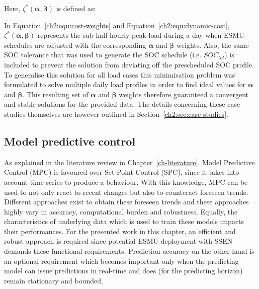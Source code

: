 

Here, $\zeta^*(\boldsymbol{\alpha}, \boldsymbol{\beta})$ is defined as:



In Equation~\ref{ch2:equ:cost-weights} and Equation~\ref{ch2:equ:dynamic-cost}, $\zeta^*(\boldsymbol{\alpha}, \boldsymbol{\beta})$ represents the sub-half-hourly peak load during a day when ESMU schedules are adjusted with the corresponding $\boldsymbol{\alpha}$ and $\boldsymbol{\beta}$ weights.
Also, the same SOC tolerance that was used to generate the SOC schedule (i.e. $SOC_{tol}$) is included to prevent the solution from deviating off the prescheduled SOC profile.
To generalise this solution for all load cases this minimisation problem was formulated to solve multiple daily load profiles in order to find ideal values for $\boldsymbol{\alpha}$ and $\boldsymbol{\beta}$.
This resulting set of $\boldsymbol{\alpha}$ and $\boldsymbol{\beta}$ weights therefore guaranteed a convergent and stable solutions for the provided data.
The details concerning these case studies themselves are however outlined in Section~\ref{ch2:sec:case-studies}.

\subsection{Model predictive control}

As explained in the literature review in Chapter~\ref{ch-literature}, Model Predictive Control (MPC) is favoured over Set-Point Control (SPC), since it takes into account time-series to produce a behaviour.
With this knowledge, MPC can be used to not only react to recent changes but also to counteract foreseen trends.
Different approaches exist to obtain these foreseen trends and these approaches highly vary in accuracy, computational burden and robustness.
Equally, the characteristics of underlying data which is used to train these models impacts their performances.
For the presented work in this chapter, an efficient and robust approach is required since potential ESMU deployment with SSEN demands these functional requirements.
Prediction accuracy on the other hand is an optional requirement which becomes important only when the predicting model can issue predictions in real-time and does (for the predicting horizon) remain stationary and bounded.

